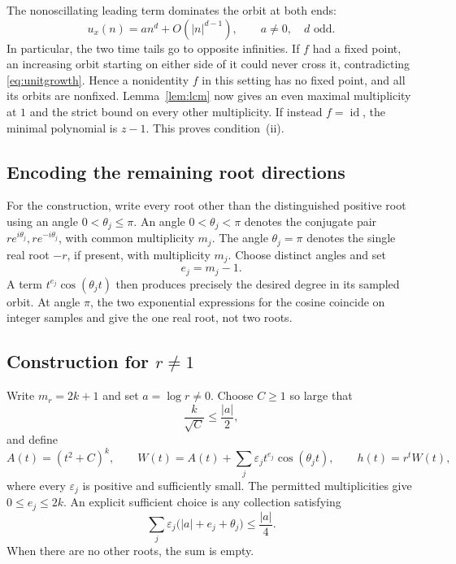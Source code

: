 \documentclass[11pt,letterpaper]{article}
\theoremstyle{definition}
\theoremstyle{remark}
\newcommand{\id}{\operatorname{id}}
\begin{document}
The nonoscillating leading term dominates the orbit at both ends:
\begin{equation}
  u_x(n)=a n^d+O(|n|^{d-1}),\qquad a\ne0,\quad d\text{ odd}.
  \label{eq:unitgrowth}
\end{equation}
In particular, the two time tails go to opposite infinities. If $f$ had
a fixed point, an increasing orbit starting on either side of it could
never cross it, contradicting \eqref{eq:unitgrowth}. Hence a nonidentity
$f$ in this setting has no fixed point, and all its orbits are nonfixed.
Lemma~\ref{lem:lcm} now gives an even maximal multiplicity at $1$ and the
strict bound on every other multiplicity. If instead $f=\id$, the minimal
polynomial is $z-1$. This proves condition~(ii).

\subsection{Encoding the remaining root directions}

For the construction, write every root other than the distinguished
positive root using an angle $0<\theta_j\le\pi$. An angle
$0<\theta_j<\pi$ denotes the conjugate pair
$r e^{i\theta_j},r e^{-i\theta_j}$, with common multiplicity $m_j$.
The angle $\theta_j=\pi$ denotes the single real root $-r$, if present,
with multiplicity $m_j$. Choose distinct angles and set
\begin{equation}
  e_j=m_j-1.
\end{equation}
A term $t^{e_j}\cos(\theta_jt)$ then produces precisely the desired degree
in its sampled orbit. At angle $\pi$, the two exponential expressions
for the cosine coincide on integer samples and give the one real root,
not two roots.

\subsection{Construction for \texorpdfstring{$r\ne1$}{r is not 1}}
\label{sec:construction-nonunit}

Write $m_r=2k+1$ and set $a=\log r\ne0$. Choose $C\ge1$ so large that
\begin{equation}
  \frac{k}{\sqrt C}\le\frac{|a|}{2},
\end{equation}
and define
\begin{equation}
  A(t)=(t^2+C)^k,\qquad
  W(t)=A(t)+\sum_j\varepsilon_j t^{e_j}\cos(\theta_jt),\qquad
  h(t)=r^tW(t),
  \label{eq:nonunitH}
\end{equation}
where every $\varepsilon_j$ is positive and sufficiently small.
The permitted multiplicities give $0\le e_j\le2k$.
An explicit sufficient choice is any collection satisfying
\begin{equation}
  \sum_j\varepsilon_j\bigl(|a|+e_j+\theta_j\bigr)
     \le\frac{|a|}{4}.
  \label{eq:eps-nonunit}
\end{equation}
When there are no other roots, the sum is empty.
\end{document}
